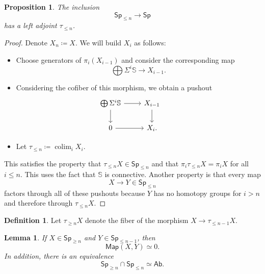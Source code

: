 \documentclass[10pt]{amsart}
\newtheorem{prop}[thm]{Proposition}
\newtheorem{lem}[thm]{Lemma}
\theoremstyle{definition}
\newtheorem{defn}[thm]{Definition}
\theoremstyle{remark}
\theoremstyle{plain}
\theoremstyle{definition}
\theoremstyle{remark}
\newcommand{\bS}{\mathbb{S}}
\newcommand{\ms}[1]{\mathsf{#1}}
\newcommand{\1}{\mathbf{1}}
\newcommand{\2}{\mathbf{2}}
\newcommand{\3}{\mathbf{3}}
\DeclareMathOperator*{\colim}{colim}
\begin{document}
\begin{prop}
    The inclusion
    \[ \ms{Sp}_{\leq n} \to \ms{Sp} \]
    has a left adjoint $\tau_{\leq n}$.
\end{prop}

\begin{proof}
    Denote $X_n \coloneqq X$. We will build $X_i$ as follows:
    \begin{itemize}
        \item Choose generators of $\pi_i(X_{i-1})$ and consider the corresponding map
        \[ \bigoplus \Sigma^i \bS \to X_{i-1}. \]
        \item Considering the cofiber of this morphism, we obtain a pushout
        \begin{equation*}
        \begin{tikzcd}
            \bigoplus \Sigma^i \bS \ar{r} \ar{d} & X_{i-1} \ar{d} & \\
            0 \ar{r} & X_i.
        \end{tikzcd}
        \end{equation*}
        \item Let $\tau_{\leq n} \coloneqq \colim_i X_i$.
    \end{itemize}
    This satisfies the property that $\tau_{\leq n} X \in \ms{Sp}_{\leq n}$ and that $\pi_i \tau_{\leq n} X = \pi_i X$ for all $i \leq n$. This uses the fact that $\bS$ is connective. Another property is that every map
    \[ X \to Y \in \ms{Sp}_{\leq n} \]
    factors through all of these pushouts because $Y$ has no homotopy groups for $i > n$ and therefore through $\tau_{\leq n} X$.
\end{proof}

\begin{defn}
    Let $\tau_{\geq n} X$ denote the fiber of the morphism $X \to \tau_{\leq n-1} X$.
\end{defn}

\begin{lem}
    If $X \in \ms{Sp}_{\geq n}$ and $Y \in \ms{Sp}_{\leq n-1}$, then
    \[ \ms{Map}(X, Y) \simeq 0. \]
    In addition, there is an equivalence
    \[ \ms{Sp}_{\geq n} \cap \ms{Sp}_{\leq n} \simeq \ms{Ab}. \]
\end{lem}
\end{document}
